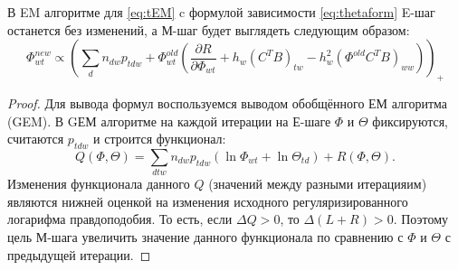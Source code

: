 \label{thetaless_em}
В EM алгоритме для \ref{eq:tEM} c формулой зависимости \ref{eq:thetaform} E-шаг останется без изменений, а М-шаг будет выглядеть следующим образом:
\begin{equation} \label{eq:Mstep_noTheta}
\Phi_{wt}^{new}  \propto \left( \sum_{d} n_{dw} p_{tdw} + \Phi_{wt}^{old} \left( \frac{\partial{R}}{\partial{\Phi_{wt}}} + h_w (C^T B)_{tw} - h_w^2 ({\Phi^{old}} C^T B)_{ww} \right) \right)_{+}
\end{equation}
\begin{proof}
Для вывода формул воспользуемся выводом обобщённого ЕМ алгоритма (GEM). В GЕМ алгоритме на каждой итерации на Е-шаге $\Phi$ и $\Theta$  фиксируются, считаются $p_{tdw}$ и строится функционал: 
\[
Q(\Phi, \Theta) = \sum_{dtw} n_{dw} p_{tdw} \left( \ln \Phi_{wt} + \ln \Theta_{td}\right) + R(\Phi, \Theta).
\]
Изменения функционала данного $Q$ (значений между разными итерацияим) являются нижней оценкой на изменения исходного регуляризированного логарифма правдоподобия. То есть, если $\Delta Q > 0$, то $\Delta(L + R) > 0$.  Поэтому цель М-шага увеличить значение данного функционала по сравнению с $\Phi$ и $\Theta$ с предыдущей итерации.


\end{proof}
